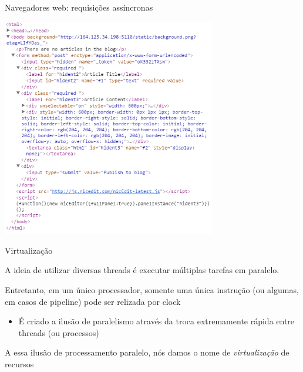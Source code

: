 \documentclass[compress]{beamer}
\begin{document}

\begin{frame}{Navegadores web: requisições assíncronas}

\centering \includegraphics[width=0.7\textwidth]{images/browser_example2.png}

\end{frame}


\begin{frame}{Virtualização}

A ideia de utilizar diversas threads é executar múltiplas tarefas em paralelo.

\vspace{0.5cm}

Entretanto, em um único processador, somente uma única instrução (ou algumas, em casos de pipeline) pode ser relizada por clock
\begin{itemize}
    \item É criado a ilusão de paralelismo através da troca extremamente rápida entre threads (ou processos)
\end{itemize}

\vspace{0.5cm}

A essa ilusão de processamento paralelo, nós damos o nome de \textit{virtualização} de recursos
\end{frame}

\end{document}
